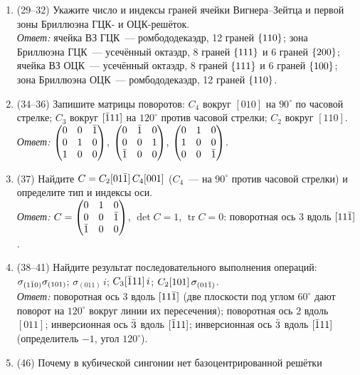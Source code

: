 \begin{enumerate}[label={\sffamily\bfseries\color{fmHead}\arabic*.}]
$a[1\br10]=2(\vb p_3-\vb p_2)$, т.\,е. $[0\br22]$, или направление $[0\br11]$.
\item (29--32) Укажите число и индексы граней ячейки Вигнера--Зейтца и
первой зоны Бриллюэна ГЦК- и ОЦК-решёток.\\
\emph{Ответ:} ячейка ВЗ ГЦК~— ромбододекаэдр, 12 граней $\{110\}$;
зона Бриллюэна ГЦК~— усечённый октаэдр, 8 граней $\{111\}$ и 6 граней
$\{200\}$; ячейка ВЗ ОЦК~— усечённый октаэдр, 8 граней $\{111\}$ и
6 граней $\{100\}$; зона Бриллюэна ОЦК~— ромбододекаэдр, 12 граней
$\{110\}$.
\item (34--36) Запишите матрицы поворотов: $C_4$ вокруг $[010]$ на
$90^\circ$ по часовой стрелке; $C_3$ вокруг $[\bar{1}11]$ на $120^\circ$
против часовой стрелки; $C_2$ вокруг $[110]$.\\
\emph{Ответ:}
$\begin{pmatrix}0&0&\bar{1}\\0&1&0\\1&0&0\end{pmatrix}$,
$\begin{pmatrix}0&\bar{1}&0\\0&0&1\\\bar{1}&0&0\end{pmatrix}$,
$\begin{pmatrix}0&1&0\\1&0&0\\0&0&\bar{1}\end{pmatrix}$.
\item (37) Найдите $C=C_2[01\bar{1}]\,C_4[001]$ ($C_4$~— на $90^\circ$ против
часовой стрелки) и определите тип и индексы оси.\\
\emph{Ответ:} $C=\begin{pmatrix}0&1&0\\0&0&\bar{1}\\\bar{1}&0&0\end{pmatrix}$,
$\det C=1$, $\operatorname{tr}C=0$: поворотная ось 3 вдоль $[11\bar{1}]$.
\item (38--41) Найдите результат последовательного выполнения
операций: $\sigma_{(1\bar{1}0)}\sigma_{(101)}$; $\sigma_{(011)}\,i$;
$C_3[\bar{1}11]\,i$; $C_2[101]\,\sigma_{(01\bar{1})}$.\\
\emph{Ответ:} поворотная ось 3 вдоль $[11\bar{1}]$ (две плоскости под
углом $60^\circ$ дают поворот на $120^\circ$ вокруг линии их пересечения);
поворотная ось 2 вдоль $[011]$; инверсионная ось $\bar{3}$ вдоль $[\bar{1}11]$;
инверсионная ось $\bar{3}$ вдоль $[\bar{1}11]$ (определитель $-1$, угол
$120^\circ$).
\item (46) Почему в кубической сингонии нет базоцентрированной решётки

\end{enumerate}
